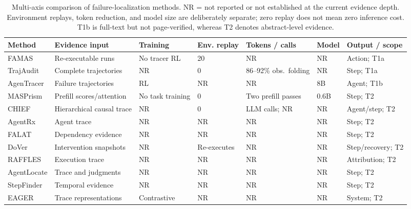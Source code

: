 \begin{table}[t]
\centering
\caption{Multi-axis comparison of failure-localization methods. NR = not reported or not established at the current evidence depth. Environment replays, token reduction, and model size are deliberately separate; zero replay does not mean zero inference cost. T1b is full-text but not page-verified, whereas T2 denotes abstract-level evidence.}
\label{tab:failure_loc}
\scriptsize
\setlength{\tabcolsep}{2.1pt}
\begin{tabularx}{\textwidth}{@{}p{}p{}p{}p{}p{}p{}X@{}}
\toprule
\textbf{Method} & \textbf{Evidence input} & \textbf{Training} & \textbf{Env. replay} & \textbf{Tokens / calls} & \textbf{Model} & \textbf{Output / scope} \\
\midrule
FAMAS & Re-executable runs & No tracer RL & 20 & NR & NR & Action; T1a \\
TrajAudit & Complete trajectories & NR & 0 & 86--92\% obs.\ folding & NR & Step; T1a \\
AgenTracer & Failure trajectories & RL & NR & NR & 8B & Agent; T1b \\
MASPrism & Prefill scores/attention & No task training & 0 & Two prefill passes & 0.6B & Step; T2 \\
CHIEF & Hierarchical causal trace & NR & 0 & LLM calls; NR & NR & Agent/step; T2 \\
AgentRx & Agent trace & NR & NR & NR & NR & Step; T2 \\
FALAT & Dependency evidence & NR & NR & NR & NR & Step; T2 \\
DoVer & Intervention snapshots & NR & Re-executes & NR & NR & Step/recovery; T2 \\
RAFFLES & Execution trace & NR & NR & NR & NR & Attribution; T2 \\
AgentLocate & Trace and judgments & NR & NR & NR & NR & Step; T2 \\
StepFinder & Temporal evidence & NR & NR & NR & NR & Step; T2 \\
EAGER & Trace representations & Contrastive & NR & NR & NR & System; T2 \\
\bottomrule
\end{tabularx}
\end{table}

